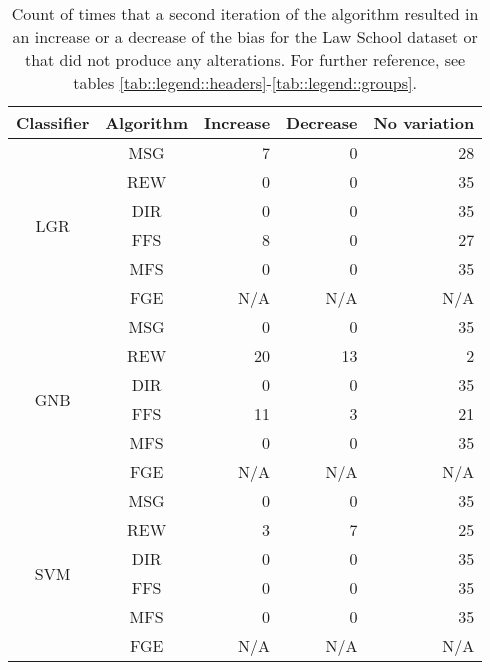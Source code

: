 \begin{table}[htbp]
    \begin{center}
        \caption{Count of times that a second iteration of the algorithm resulted in an increase or a decrease of the bias for the Law School dataset or that did not produce any alterations. For further reference, see tables \ref{tab::legend::headers}-\ref{tab::legend::groups}.}
        \label{tab::law_school::admission::multiple_iterations}
            \begin{tabular}{|c|c|r|r|r|}
                \hline
                \multirow{1}{*}{Classifier} & \multirow{1}{*}{Algorithm} & \multicolumn{1}{c|}{Increase} & \multicolumn{1}{c|}{Decrease} & \multicolumn{1}{c|}{No variation} \\
                \hline

                \multirow{6}{*}{LGR} & MSG & 7 & 0 & 28 \\
                \cline{2-5}
                    & REW & 0 & 0 & 35 \\
                \cline{2-5}
                    & DIR & 0 & 0 & 35 \\
                \cline{2-5}
                    & FFS &  8 & 0 & 27 \\
                \cline{2-5}
                    & MFS & 0 & 0 & 35 \\
                \cline{2-5}
                    & FGE & N/A & N/A & N/A \\
                \cline{1-5}

                \multirow{6}{*}{GNB} & MSG & 0 & 0 & 35 \\
                \cline{2-5}
                    & REW & 20 & 13 & 2 \\
                \cline{2-5}
                    & DIR & 0 & 0 & 35 \\
                \cline{2-5}
                    & FFS &  11 & 3 & 21 \\
                \cline{2-5}
                    & MFS & 0 & 0 & 35 \\
                \cline{2-5}
                    & FGE & N/A & N/A & N/A \\
                \cline{1-5}

                \multirow{6}{*}{SVM} & MSG & 0 & 0 & 35 \\
                \cline{2-5}
                    & REW & 3 & 7 & 25 \\
                \cline{2-5}
                    & DIR & 0 & 0 & 35 \\
                \cline{2-5}
                    & FFS &  0 & 0 & 35 \\
                \cline{2-5}
                    & MFS & 0 & 0 & 35 \\
                \cline{2-5}
                    & FGE & N/A & N/A & N/A \\
                \cline{1-5}


\end{tabular}
\end{center}
\end{table}

